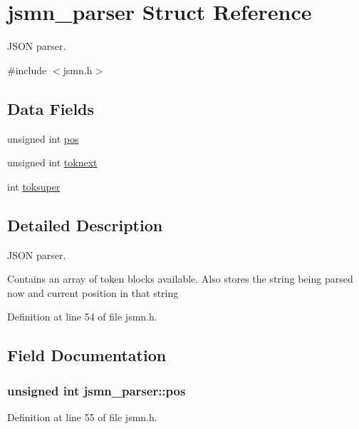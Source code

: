 \hypertarget{structjsmn__parser}{}\section{jsmn\+\_\+parser Struct Reference}
\label{structjsmn__parser}


J\+S\+O\+N parser.  




{\ttfamily \#include $<$jsmn.\+h$>$}

\subsection*{Data Fields}
\begin{DoxyCompactItemize}
\item 
unsigned int \hyperlink{structjsmn__parser_a3d0d6e48d3d5b24262f9e0c2241dc456}{pos}
\item 
unsigned int \hyperlink{structjsmn__parser_af640efd7d154218124a964b65f114bff}{toknext}
\item 
int \hyperlink{structjsmn__parser_af11fcec48d9f1298909777a12f1d1e39}{toksuper}
\end{DoxyCompactItemize}


\subsection{Detailed Description}
J\+S\+O\+N parser. 

Contains an array of token blocks available. Also stores the string being parsed now and current position in that string 

Definition at line 54 of file jsmn.\+h.



\subsection{Field Documentation}
\hypertarget{structjsmn__parser_a3d0d6e48d3d5b24262f9e0c2241dc456}{}
\subsubsection[{pos}]{\setlength{\rightskip}{0pt plus 5cm}unsigned int jsmn\+\_\+parser\+::pos}\label{structjsmn__parser_a3d0d6e48d3d5b24262f9e0c2241dc456}


Definition at line 55 of file jsmn.\+h.

